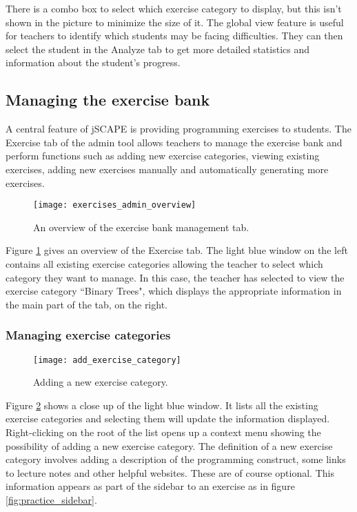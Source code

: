 There is a combo box to select which exercise category to display, but this isn't shown in the picture to minimize the size of it. The global view feature is useful for teachers to identify which students may be facing difficulties. They can then select the student in the Analyze tab to get more detailed statistics and information about the student's progress.

\subsection{Managing the exercise bank}
A central feature of jSCAPE is providing programming exercises to students. The Exercise tab of the admin tool allows teachers to manage the exercise bank and perform functions such as adding new exercise categories, viewing existing exercises, adding new exercises manually and automatically generating more exercises.

\begin{figure}[H]
\centering
\texttt{[image: exercises\_admin\_overview]}
\caption{An overview of the exercise bank management tab.}
\label{fig:exercises_admin_overview}
\end{figure}

Figure \ref{fig:exercises_admin_overview} gives an overview of the Exercise tab. The light blue window on the left contains all existing exercise categories allowing the teacher to select which category they want to manage. In this case, the teacher has selected to view the exercise category ``Binary Trees", which displays the appropriate information in the main part of the tab, on the right.

\subsubsection{Managing exercise categories}
\begin{figure}[H]
\centering
\texttt{[image: add\_exercise\_category]}
\caption{Adding a new exercise category.}
\label{fig:add_exercise_category}
\end{figure}

Figure \ref{fig:add_exercise_category} shows a close up of the light blue window. It lists all the existing exercise categories and selecting them will update the information displayed. Right-clicking on the root of the list opens up a context menu showing the possibility of adding a new exercise category. The definition of a new exercise category involves adding a description of the programming construct, some links to lecture notes and other helpful websites. These are of course optional. This information appears as part of the sidebar to an exercise as in figure \ref{fig:practice_sidebar}.\newline

